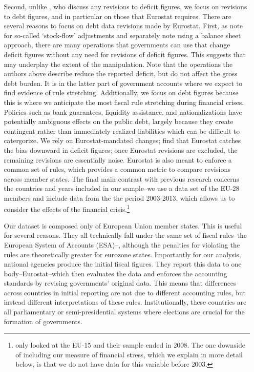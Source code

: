 \documentclass[]{article}
\begin{document}
Second, unlike \cite{DeCastro2013}, who discuss any revisions to deficit figures, we focus on  revisions to debt figures, and in particular on those that Eurostat requires. There are several reasons to focus on debt data revisions made by Eurostat. First, as \cite{vonHagenWolff2006} note for so-called `stock-flow' adjustments and \cite{MilesiMoriyama2006}  separately note using a balance sheet approach, there are many operations that governments can use that change deficit figures without any need for revisions of deficit figures. This suggests that \cite{DeCastro2013} may underplay the extent of the manipulation. Note that the operations the authors above describe reduce the reported deficit, but do not affect the gross debt burden. It is in the latter part of government accounts where we expect to find evidence of rule stretching. Additionally, we focus on debt figures because this is where we anticipate the most fiscal rule stretching during financial crises. Policies such as bank guarantees, liquidity assistance, and nationalizations have potentially ambiguous effects on the public debt, largely because they create contingent rather than immediately realized liabilities which can be difficult to catergorize. We rely on Eurostat-mandated changes; \cite{DeCastro2013} find that Eurostat catches the bias downward in deficit figures; once Eurostat revisions are excluded, the remaining revisions are essentially noise. Eurostat is also meant to enforce a common set of rules, which provides a common metric to compare revisions across member states. The final main contrast with previous research concerns the countries and years included in our sample--we use a data set of the EU-28 members and include data from the the period 2003-2013, which allows us to consider the effects of the financial crisis.\footnote{\cite{DeCastro2013} only looked at the EU-15 and their sample ended in 2008. The one downside of including our measure of financial stress, which we explain in more detail below, is that we do not have data for this variable before 2003.}

Our dataset is composed only of European Union member states. This is useful for several reasons. They all technically fall under the same set of fiscal rules--the European System of Accounts (ESA)--, although the penalties for violating the rules are theoretically greater for eurozone states.  Importantly for our analysis, national agencies produce the initial fiscal figures. They report this data to one body--Eurostat--which then evaluates the data and enforces the accounting standards by revising governments' original data. This means that differences across countries in initial reporting are not due to different accounting rules, but instead  different interpretations of these rules. Institutionally, these countries are all parliamentary or semi-presidential systems where elections are crucial for the formation of governments.
\end{document}
